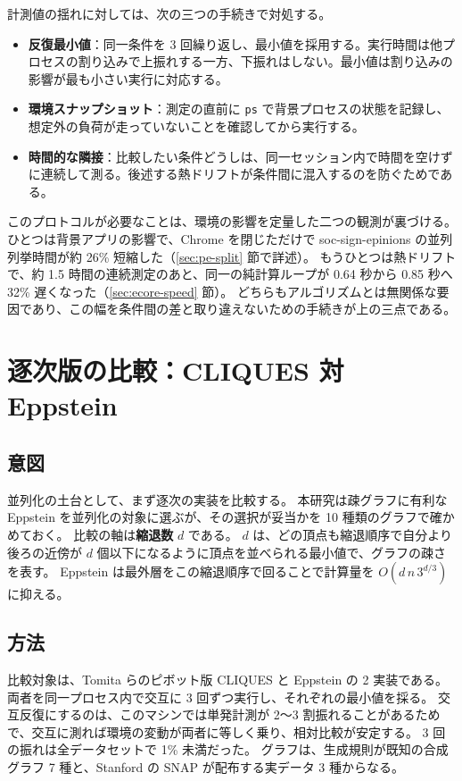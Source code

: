 計測値の揺れに対しては、次の三つの手続きで対処する。

\begin{itemize}
  \item \textbf{反復最小値}：同一条件を 3 回繰り返し、最小値を採用する。実行時間は他プロセスの割り込みで上振れする一方、下振れはしない。最小値は割り込みの影響が最も小さい実行に対応する。
  \item \textbf{環境スナップショット}：測定の直前に \texttt{ps} で背景プロセスの状態を記録し、想定外の負荷が走っていないことを確認してから実行する。
  \item \textbf{時間的な隣接}：比較したい条件どうしは、同一セッション内で時間を空けずに連続して測る。後述する熱ドリフトが条件間に混入するのを防ぐためである。
\end{itemize}

このプロトコルが必要なことは、環境の影響を定量した二つの観測が裏づける。
ひとつは背景アプリの影響で、Chrome を閉じただけで soc-sign-epinions の並列列挙時間が約 26\% 短縮した（\ref{sec:pe-split} 節で詳述）。
もうひとつは熱ドリフトで、約 1.5 時間の連続測定のあと、同一の純計算ループが 0.64 秒から 0.85 秒へ 32\% 遅くなった（\ref{sec:ecore-speed} 節）。
どちらもアルゴリズムとは無関係な要因であり、この幅を条件間の差と取り違えないための手続きが上の三点である。

\section{逐次版の比較：CLIQUES 対 Eppstein}
\label{sec:seq-compare}

\subsection{意図}

並列化の土台として、まず逐次の実装を比較する。
本研究は疎グラフに有利な Eppstein を並列化の対象に選ぶが、その選択が妥当かを 10 種類のグラフで確かめておく。
比較の軸は\textbf{縮退数} $d$ である。
$d$ は、どの頂点も縮退順序で自分より後ろの近傍が $d$ 個以下になるように頂点を並べられる最小値で、グラフの疎さを表す。
Eppstein は最外層をこの縮退順序で回ることで計算量を $O(d\,n\,3^{d/3})$ に抑える。

\subsection{方法}

比較対象は、Tomita らのピボット版 CLIQUES と Eppstein の 2 実装である。
両者を同一プロセス内で交互に 3 回ずつ実行し、それぞれの最小値を採る。
交互反復にするのは、このマシンでは単発計測が 2〜3 割振れることがあるためで、交互に測れば環境の変動が両者に等しく乗り、相対比較が安定する。
3 回の振れは全データセットで 1\% 未満だった。
グラフは、生成規則が既知の合成グラフ 7 種と、Stanford の SNAP が配布する実データ 3 種からなる。


